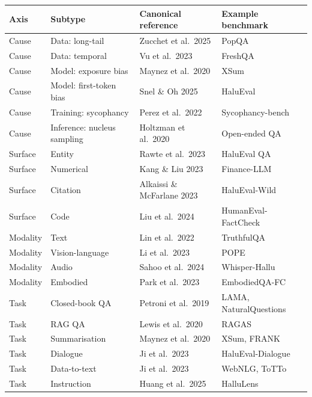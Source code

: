 {\def\LTcaptype{none} %
\begin{longtable}[]{@{}
  >{\raggedright\arraybackslash}p{}
  >{\raggedright\arraybackslash}p{}
  >{\raggedright\arraybackslash}p{}
  >{\raggedright\arraybackslash}p{}@{}}
\toprule\noalign{}
\begin{minipage}[b]{\linewidth}\raggedright
Axis
\end{minipage} & \begin{minipage}[b]{\linewidth}\raggedright
Subtype
\end{minipage} & \begin{minipage}[b]{\linewidth}\raggedright
Canonical reference
\end{minipage} & \begin{minipage}[b]{\linewidth}\raggedright
Example benchmark
\end{minipage} \\
\midrule\noalign{}
\endhead
\bottomrule\noalign{}
\endlastfoot
Cause & Data: long-tail & Zucchet et al.~2025 & PopQA \\
Cause & Data: temporal & Vu et al.~2023 & FreshQA \\
Cause & Model: exposure bias & Maynez et al.~2020 & XSum \\
Cause & Model: first-token bias & Snel \& Oh 2025 & HaluEval \\
Cause & Training: sycophancy & Perez et al.~2022 & Sycophancy-bench \\
Cause & Inference: nucleus sampling & Holtzman et al.~2020 & Open-ended QA \\
Surface & Entity & Rawte et al.~2023 & HaluEval QA \\
Surface & Numerical & Kang \& Liu 2023 & Finance-LLM \\
Surface & Citation & Alkaissi \& McFarlane 2023 & HaluEval-Wild \\
Surface & Code & Liu et al.~2024 & HumanEval-FactCheck \\
Modality & Text & Lin et al.~2022 & TruthfulQA \\
Modality & Vision-language & Li et al.~2023 & POPE \\
Modality & Audio & Sahoo et al.~2024 & Whisper-Hallu \\
Modality & Embodied & Park et al.~2023 & EmbodiedQA-FC \\
Task & Closed-book QA & Petroni et al.~2019 & LAMA, NaturalQuestions \\
Task & RAG QA & Lewis et al.~2020 & RAGAS \\
Task & Summarisation & Maynez et al.~2020 & XSum, FRANK \\
Task & Dialogue & Ji et al.~2023 & HaluEval-Dialogue \\
Task & Data-to-text & Ji et al.~2023 & WebNLG, ToTTo \\
Task & Instruction & Huang et al.~2025 & HalluLens \\
\end{longtable}
}

